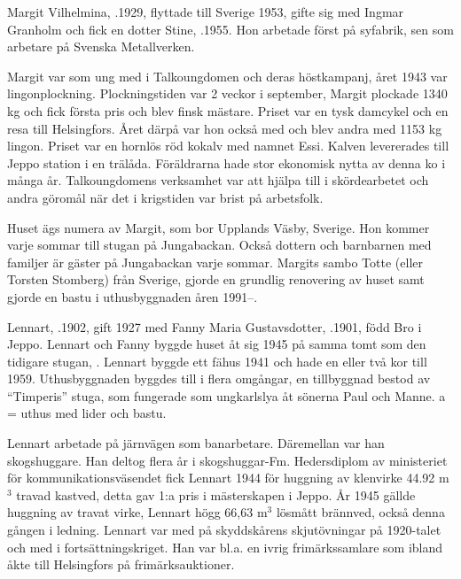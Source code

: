 
%
Margit Vilhelmina, .1929, flyttade till Sverige 1953, gifte sig med Ingmar Granholm och fick en dotter Stine, .1955. Hon arbetade först på syfabrik, sen som arbetare på Svenska Metallverken.

Margit var som ung med i Talkoungdomen och deras höstkampanj, året 1943 var lingonplockning. Plockningstiden var 2 veckor i september, Margit plockade 1340 kg och fick första pris och blev finsk mästare. Priset var en tysk damcykel och en resa till Helsingfors. Året därpå var hon också med och blev andra med 1153 kg lingon. Priset var en hornlös röd kokalv med namnet Essi. Kalven levererades till Jeppo station i en trälåda. Föräldrarna hade stor ekonomisk nytta av denna ko i många år. Talkoungdomens verksamhet var att hjälpa till i skördearbetet och andra göromål när det i krigstiden var brist på arbetsfolk.

Huset ägs numera av Margit, som bor Upplands Väsby, Sverige. Hon kommer varje sommar till stugan på Jungabackan. Också dottern och barnbarnen med familjer är gäster på Jungabackan varje sommar. Margits sambo Totte (eller Torsten Stomberg)  från Sverige, gjorde en grundlig renovering av huset samt gjorde en bastu i uthusbyggnaden åren 1991--.



%
Lennart, .1902, gift 1927 med Fanny Maria Gustavsdotter, .1901, född Bro i Jeppo. Lennart och Fanny byggde huset åt sig 1945 på samma tomt som den tidigare stugan, . Lennart byggde ett fähus 1941 och hade en eller två kor till 1959. Uthusbyggnaden byggdes till i flera omgångar, en tillbyggnad bestod av ``Timperis'' stuga, som fungerade som ungkarlslya åt sönerna Paul och Manne. a = uthus med lider och bastu.

Lennart arbetade på järnvägen som banarbetare. Däremellan var han skogshuggare. Han deltog flera år i skogshuggar-Fm. Hedersdiplom av ministeriet för kommunikationsväsendet fick Lennart 1944 för huggning av klenvirke 44.92 m$^3$ travad kastved, detta gav 1:a pris i mästerskapen i Jeppo. År 1945 gällde huggning av travat virke, Lennart högg 66,63 m$^3$ lösmått brännved, också denna gången i ledning. Lennart var med på skyddskårens skjutövningar på 1920-talet och med i 	fortsättningskriget. Han var bl.a. en ivrig frimärkssamlare som ibland åkte till Helsingfors på frimärksauktioner.

